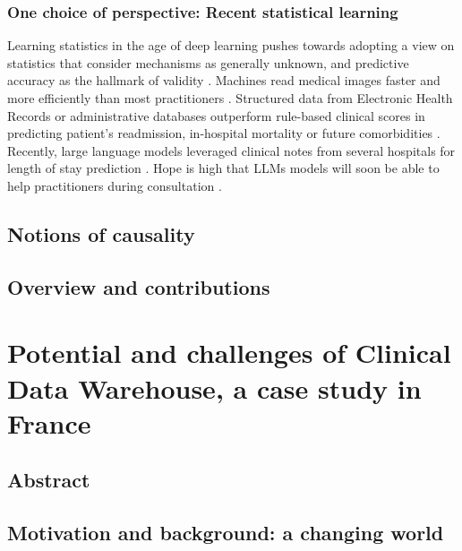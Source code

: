 \documentclass{report}
\begin{document}
\subsection{One choice of perspective: Recent statistical
  learning}\label{subsec:intro:recent_statistical_learning}
% 
Learning statistics in the age of deep learning pushes towards adopting a view
on statistics that consider mechanisms as generally unknown, and predictive
accuracy as the hallmark of validity \citep{breiman2001statistical}.
% 
Machines read medical images faster
and more efficiently than most practitioners \citep{zhou2021review}.
Structured data from Electronic Health Records \citep{rajkomar2018scalable} or
administrative databases \citep{beaulieu2021machine} outperform rule-based
clinical scores in predicting patient's readmission, in-hospital mortality or
future comorbidities \citep{li2020behrt}. Recently, large language models
leveraged clinical notes from several hospitals for length of stay prediction
\citep{jiang2023health}. Hope is high that LLMs models will soon be able to
help practitioners during consultation \citep{lee2023benefits}.


\section{Notions of causality}\label{sec:intro:causality}



\section{Overview and contributions}\label{sec:intro:contributions}



\chapter{Potential and challenges of Clinical Data Warehouse, a case study in France}\label{chapter:cdw}

\section{Abstract}\label{sec:cdw:abstract}
\section{Motivation and background: a changing world}\label{sec:cdw:motivation}
\end{document}
